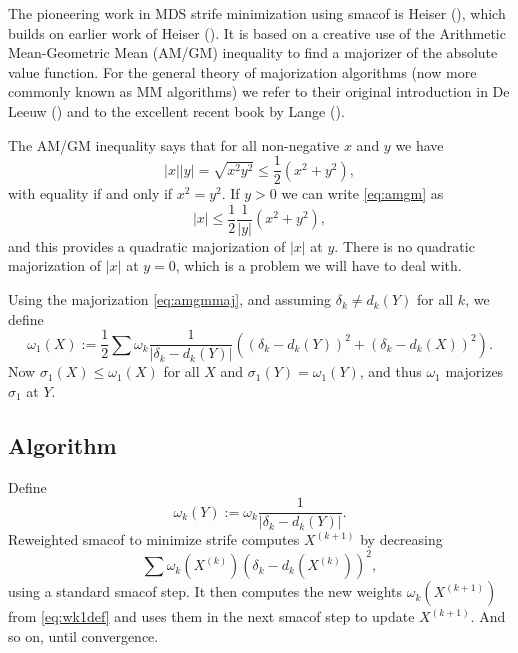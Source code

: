 \documentclass[
  12pt,
  letterpaper,
  DIV=11,
  numbers=noendperiod]{scrartcl}
\theoremstyle{definition}
\theoremstyle{plain}
\theoremstyle{plain}
\theoremstyle{remark}
\begin{document}
The pioneering work in MDS strife minimization using smacof is Heiser
(), which builds on earlier work of Heiser
(). It is based on a creative use of the
Arithmetic Mean-Geometric Mean (AM/GM) inequality to find a majorizer of
the absolute value function. For the general theory of majorization
algorithms (now more commonly known as MM algorithms) we refer to their
original introduction in De Leeuw ()
and to the excellent recent book by Lange
().

The AM/GM inequality says that for all non-negative \(x\) and \(y\) we
have \begin{equation}
|x||y|=\sqrt{x^2y^2}\leq\frac12(x^2+y^2),\label{eq:amgm}
\end{equation} with equality if and only if \(x^2=y^2\). If \(y>0\) we
can write \eqref{eq:amgm} as \begin{equation}
|x|\leq\frac12\frac{1}{|y|}(x^2+y^2),\label{eq:amgmmaj}
\end{equation} and this provides a quadratic majorization of \(|x|\) at
\(y\). There is no quadratic majorization of \(|x|\) at \(y=0\), which
is a problem we will have to deal with.

Using the majorization \eqref{eq:amgmmaj}, and assuming
\(\delta_k\not=d_k(Y)\) for all \(k\), we define \begin{equation}
\omega_1(X):=\frac12\sum \omega_k\frac{1}{|\delta_k-d_k(Y)|}((\delta_k-d_k(Y))^2+(\delta_k-d_k(X))^2).\label{eq:omegadef}
\end{equation} Now \(\sigma_1(X)\leq\omega_1(X)\) for all \(X\) and
\(\sigma_1(Y)=\omega_1(Y)\), and thus \(\omega_1\) majorizes
\(\sigma_1\) at \(Y\).

\subsection{Algorithm}\label{sec-amgm}

Define \begin{equation}
\omega_k(Y):=\omega_k\frac{1}{|\delta_k-d_k(Y)|}.\label{eq:wk1def}
\end{equation} Reweighted smacof to minimize strife computes
\(X^{(k+1)}\) by decreasing \begin{equation}
\sum \omega_k(X^{(k)})(\delta_k-d_k(X^{(k)}))^2,\label{eq:sstrf}
\end{equation} using a standard smacof step. It then computes the new
weights \(\omega_k(X^{(k+1)})\) from \eqref{eq:wk1def} and uses them in
the next smacof step to update \(X^{(k+1)}\). And so on, until
convergence.
\end{document}
